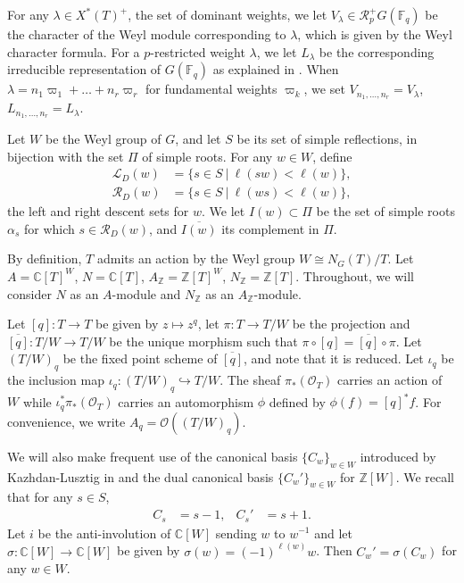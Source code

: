 \documentclass{amsart}
\theoremstyle{definition}
\newcommand{\Ce}{\mathbb{C}}
\begin{document}
For any $\lambda \in X^*(T)^+$, the set of dominant weights, we let $V_{\lambda} \in \mathcal{R}_p^+G(\mathbb{F}_q)$ be the character of the Weyl module corresponding to $\lambda$, which is given by the Weyl character formula. For a $p$-restricted weight $\lambda$, we let $L_{\lambda}$ be the corresponding irreducible representation of $G(\mathbb{F}_q)$ as explained in \cite{L}. When $\lambda = n_1\varpi_1 + \dots + n_{r}\varpi_r$ for fundamental weights $\varpi_k$, we set $V_{n_1,\dots,n_r} = V_\lambda$, $L_{n_1,\dots,n_r} = L_\lambda$.

Let $W$ be the Weyl group of $G$, and let $S$ be its set of simple reflections, in bijection with the set $\Pi$ of simple roots. For any $w \in W$, define
\begin{align*}
    \mathcal{L}_D(w) & = \{s \in S~|~\ell(sw) < \ell(w)\},\\
    \mathcal{R}_D(w) & = \{s \in S~|~\ell(ws) < \ell(w)\},
\end{align*}
the left and right descent sets for $w$. We let $I(w) \subset \Pi$ be the set of simple roots $\alpha_s$ for which $s \in \mathcal{R}_D(w)$, and $\overline{I(w)}$ its complement in $\Pi$.

By definition, $T$ admits an action by the Weyl group $W \cong N_G(T)/T$. Let $A = \mathbb{C}[T]^W$, $N = \mathbb{C}[T]$, $A_{\mathbb{Z}} = \mathbb{Z}[T]^W$, $N_{\mathbb{Z}} = \mathbb{Z}[T]$. Throughout, we will consider $N$ as an $A$-module and $N_{\mathbb{Z}}$ as an $A_{\mathbb{Z}}$-module. 

Let $[q] \colon  T \to T$ be given by $z \mapsto z^q$, let $\pi \colon  T \to T/W$ be the projection and $\overline{[q]} \colon  T/W \to T/W$ be the unique morphism such that $\pi \circ [q] = \overline{[q]} \circ \pi$. Let $(T/W)_q$ be the fixed point scheme of $\overline{[q]}$, and note that it is reduced. Let $\iota_q$ be the inclusion map $\iota_q \colon  (T/W)_q \hookrightarrow T/W$. The sheaf $\pi_*(\mathcal{O}_T)$ carries an action of $W$ while $\iota_q^*\pi_*(\mathcal{O}_T)$ carries an automorphism $\phi$ defined by $\phi(f) = [q]^*f$. For convenience, we write $A_q = \mathcal{O}((T/W)_q)$.

We will also make frequent use of the canonical basis $\{C_w\}_{w \in W}$ introduced by Kazhdan-Lusztig in \cite{KL} and the dual canonical basis $\{C_w'\}_{w \in W}$ for $\mathbb{Z}[W]$. We recall that for any $s \in S$,
\begin{align*}
    C_s & = s - 1, & C_s' & = s + 1.
\end{align*}
Let $i$ be the  anti-involution of $\Ce[W]$ sending $w$ to $w^{-1}$ and let $\sigma\colon \Ce[W]\to \Ce[W]$ be given
 by $\sigma(w)=(-1)^{\ell(w)} w$. Then $C_w' = \sigma(C_w)$ for any $w \in W$.
\end{document}
